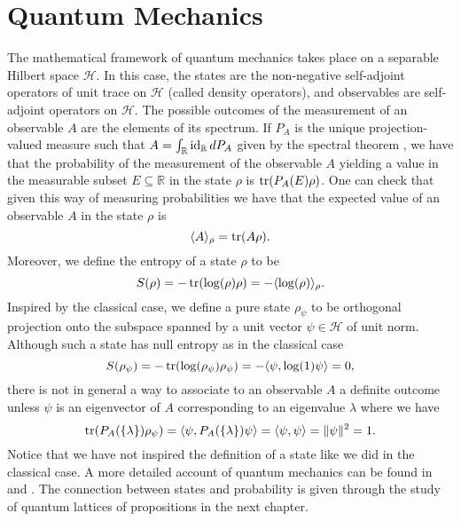 \section{Quantum Mechanics}\label{sec:QM}

The mathematical framework of quantum mechanics takes place on a separable Hilbert space $\mathcal{H}$. In this case, the states are the non-negative self-adjoint operators of unit trace on $\mathcal{H}$ (called density operators), and observables are self-adjoint operators on $\mathcal{H}$. The possible outcomes of the measurement of an observable $A$ are the elements of its spectrum. If $P_A$ is the unique projection-valued measure such that $A=\int_\mathbb{R} \operatorname{id}_\mathbb{R}dP_A$ given by the spectral theorem \cite{Hall2013}, we have that the probability of the measurement of the observable $A$ yielding a value in the measurable subset $E\subseteq\mathbb{R}$ in the state $\rho$ is $\operatorname{tr}(P_A(E)\rho)$. One can check that given this way of measuring probabilities we have that the expected value of an observable $A$ in the state $\rho$ is
\begin{equation}\label{eq:quantum_states}
\langle A\rangle_\rho = \operatorname{tr}(A\rho).
\end{equation}
Moreover, we define the entropy of a state $\rho$ to be
\begin{equation}\label{eq:Q_entropy}
S(\rho)=-\operatorname{tr}(\log(\rho)\rho)=-\langle \log(\rho)\rangle_\rho.
\end{equation}
Inspired by the classical case, we define a pure state $\rho_\psi$ to be orthogonal projection onto the subspace spanned by a unit vector $\psi\in\mathcal{H}$ of unit norm. Although such a state has null entropy as in the classical case
\begin{equation}\label{eqn:entropy_pure}
S(\rho_\psi)=-\operatorname{tr}(\log(\rho_\psi)\rho_\psi)=-\langle\psi,\log(1)\psi\rangle = 0,
\end{equation} 
there is not in general a way to associate to an observable $A$ a definite outcome unless $\psi$ is an eigenvector of $A$ corresponding to an eigenvalue $\lambda$ where we have 
\begin{equation}
\operatorname{tr}(P_A(\{\lambda\})\rho_\psi)=\langle\psi,P_A(\{\lambda\})\psi\rangle=\langle\psi,\psi\rangle=\|\psi\|^2=1. 
\end{equation}
Notice that we have not inspired the definition of a state like we did in the classical case. A more detailed account of quantum mechanics can be found in \cite{Strocchi2008a} and \cite{Hall2013}. The connection between states and probability is given through the study of quantum lattices of propositions in the next chapter.